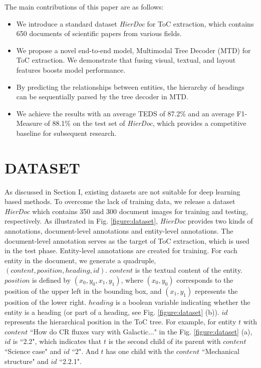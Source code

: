 \documentclass[a4paper,conference]{IEEEtran}
\begin{document}
The main contributions of this paper are as follows:

\begin{itemize}
\item We introduce a standard dataset  \textit{HierDoc} for ToC extraction, which contains 650 documents of scientific papers from various fields.
\item We propose a novel end-to-end model, Multimodal Tree Decoder (MTD) for ToC extraction. We demonstrate that fusing visual, textual, and layout features boosts model performance.
\item By predicting the relationships between entities, the hierarchy of headings can be sequentially parsed by the tree decoder in MTD.
\item We achieve the results with an average TEDS of 87.2\% and an average F1-Measure of 88.1\% on the test set of \textit{HierDoc}, which provides a competitive baseline for subsequent research.
\end{itemize}



\section{DATASET\label{sec:dataset}}
As discussed in Section I, existing datasets \cite{2015icdar, 2017icdar,2009icdar,publaynet, data:fin} are not suitable for deep learning based methods. To overcome the lack of training data, we release a dataset \textit{HierDoc} which contains 350 and 300 document images for training and testing, respectively. As illustrated in Fig. \ref{figure:dataset}, \textit{HierDoc} provides two kinds of annotations, document-level annotations and entity-level annotations. The document-level annotation serves as the target of ToC extraction, which is used in the test phase. Entity-level annotations are created for training. For each entity in the document, we generate a quadruple, $(content, position, heading, id)$. $content$ is the textual content of the entity. $position$ is defined by $( x_0, y_0, x_1, y_1)$, where $( x_0, y_0 )$ corresponds to the position of the upper left in the bounding box, and $( x_1, y_1 )$ represents the position of the lower right. $heading$ is a boolean variable indicating whether the entity is a heading (or part of a heading, see Fig. \ref{figure:dataset} (b)). $id$ represents the hierarchical position in the ToC tree. For example, for entity $t$ with $content$ ``How do CR fluxes vary with Galactic..." in the Fig. \ref{figure:dataset} (a), $id$ is ``2.2", which indicates that $t$ is the second child of its parent with $content$ ``Science case" and $id$ ``2". And $t$ has one child with the $content$ ``Mechanical structure" and $id$ ``2.2.1".
\end{document}
